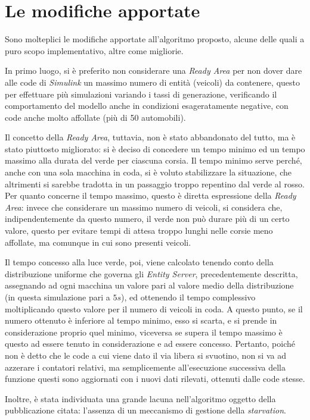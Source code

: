 \section{Le modifiche apportate}
Sono molteplici le modifiche apportate all’algoritmo proposto, alcune delle quali a puro scopo implementativo, altre come migliorie.

In primo luogo, si è preferito non considerare una \textit{Ready Area} per non dover dare alle code di \textit{Simulink} un massimo numero di entità (veicoli) da contenere, questo per effettuare più simulazioni variando i tassi di generazione, verificando il comportamento del modello anche in condizioni esageratamente negative, con code anche molto affollate (più di 50 automobili). 

Il concetto della \textit{Ready Area}, tuttavia, non è stato abbandonato del tutto, ma è stato piuttosto migliorato: si è deciso di concedere un tempo minimo ed un tempo massimo alla durata del verde per ciascuna corsia. Il tempo minimo serve perché, anche con una sola macchina in coda, si è voluto stabilizzare la situazione, che altrimenti si sarebbe tradotta in un passaggio troppo repentino dal verde al rosso. Per quanto concerne il tempo massimo, questo è diretta espressione della \textit{Ready Area}: invece che considerare un massimo numero di veicoli, si considera che, indipendentemente da questo numero, il verde non può durare più di un certo valore, questo per evitare tempi di attesa troppo lunghi nelle corsie meno affollate, ma comunque in cui sono presenti veicoli. 

Il tempo concesso alla luce verde, poi, viene calcolato tenendo conto della distribuzione uniforme che governa gli \textit{Entity Server}, precedentemente descritta, assegnando ad ogni macchina un valore pari al valore medio della distribuzione (in questa simulazione pari a $5s$), ed ottenendo il tempo complessivo moltiplicando questo valore per il numero di veicoli in coda. A questo punto, se il numero ottenuto è inferiore al tempo minimo, esso si scarta, e si prende in considerazione proprio quel minimo, viceversa se supera il tempo massimo è questo ad essere tenuto in considerazione e ad essere concesso. Pertanto, poiché non è detto che le code a cui viene dato il via libera si svuotino, non si va ad azzerare i contatori relativi, ma semplicemente all'esecuzione successiva della funzione questi sono aggiornati con i nuovi dati rilevati, ottenuti dalle code stesse.

Inoltre, è stata individuata una grande lacuna nell’algoritmo oggetto della pubblicazione citata: l’assenza di un meccanismo di gestione della \textit{starvation}. 

